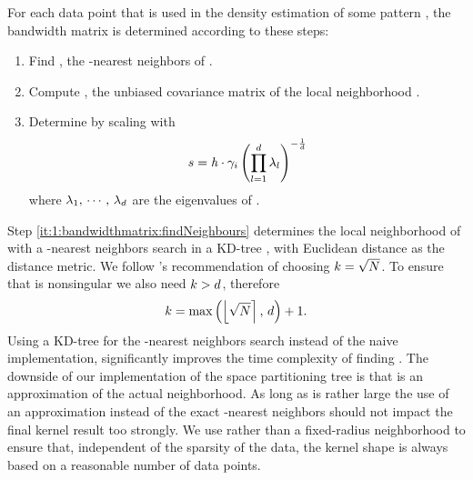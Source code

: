 	For each data point \varPattern[\itXis] that is used in the density estimation of some pattern \varPattern[\itXs], the bandwidth matrix is determined according to these steps:
		\begin{enumerate}[labelindent=0ex]
			\item \label{it:1:bandwidthmatrix:findNeighbours}
				Find \varNeighborhood{\varPattern[\itXis]}, the \KNNK-nearest neighbors of \varPattern[\itXis].
			\item \label{it:1:bandwidthmatrix:initialBandwidthMatrix}
				Compute \varCovarianceMatrix, the unbiased covariance matrix of the local neighborhood \varNeighborhood{\varPattern[\itXis]}.
			\item \label{it:1:bandwidthmatrix:scaleBandwidhtMatrix}
				Determine \varBandwidthMatrix[\itXis] by scaling \varCovarianceMatrix with
				\begin{equation}\label{eq:method:scalingFactor}
					s = \mathit{h} \cdot \gamma_{i} 
				 \left( \displaystyle\prod_{l = 1}^{d} \lambda_{l} \right)^{-\frac{1}{d}}
				\end{equation}
				where $\lambda_1,\, \cdots,\, \lambda_d$ are the eigenvalues of \varCovarianceMatrix.  
		\end{enumerate}	
		Step \ref{it:1:bandwidthmatrix:findNeighbours} determines the local neighborhood of \varPattern[\itXis] with a \KNNK-nearest neighbors search in a KD-tree \cite{Bentley1975Multidimensional}, with Euclidean distance as the distance metric. 
		We follow \citeauthor{silverman1986density}'s \cite{silverman1986density} recommendation of choosing $k = \sqrt{N}$. To ensure that \varCovarianceMatrix is nonsingular we also need $k > d$, therefore
		\begin{equation}\label{eq:method:k}
			k = \max\left(\left\lfloor \sqrt{N} \right\rceil,\, d \right) + 1.	
		\end{equation}			
		Using a KD-tree for the \KNNK-nearest neighbors search instead of the naive implementation, significantly improves the time complexity of finding \varBandwidthMatrix[\itXis]. The downside of our implementation of the space partitioning tree is that \varNeighborhood{\varPattern[\itXis]} is an approximation of the actual neighborhood. As long as \KNNK is rather large the use of an approximation instead of the exact \KNNK-nearest neighbors should not impact the final kernel result too strongly. 
		We use \KNN rather than a fixed-radius neighborhood to ensure that, independent of the sparsity of the data, the kernel shape is always based on a reasonable number of data points. 

